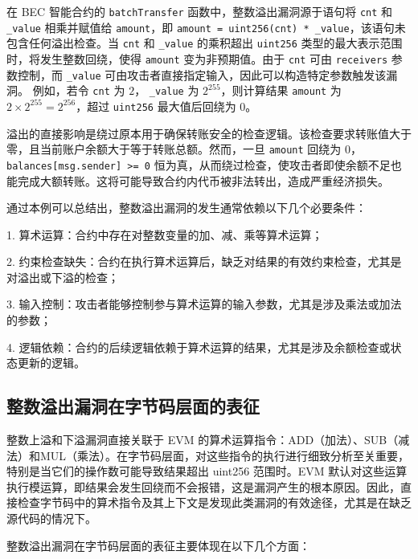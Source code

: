 \documentclass[print, master, vlined, timesmath]{DissertUESTC}
\begin{document}


在 BEC 智能合约的 \texttt{batchTransfer} 函数中，整数溢出漏洞源于语句将 \texttt{cnt} 和 \texttt{\_value} 相乘并赋值给 \texttt{amount}，即 \texttt{amount = uint256(cnt) * \_value}，该语句未包含任何溢出检查。当 \texttt{cnt} 和 \texttt{\_value} 的乘积超出 \texttt{uint256} 类型的最大表示范围时，将发生整数回绕，使得 \texttt{amount} 变为非预期值。由于 \texttt{cnt} 可由 \texttt{receivers} 参数控制，而 \texttt{\_value} 可由攻击者直接指定输入，因此可以构造特定参数触发该漏洞。 例如，若令 \texttt{cnt} 为 $2$， \texttt{\_value} 为 $2^{255}$，则计算结果 \texttt{amount} 为 $2 \times 2^{255} = 2^{256}$，超过 \texttt{uint256} 最大值后回绕为 $0$。

溢出的直接影响是绕过原本用于确保转账安全的检查逻辑。该检查要求转账值大于零，且当前账户余额大于等于转账总额。然而，一旦 \texttt{amount} 回绕为 $0$，\texttt{balances[msg.sender] >= 0} 恒为真，从而绕过检查，使攻击者即使余额不足也能完成大额转账。这将可能导致合约内代币被非法转出，造成严重经济损失。

通过本例可以总结出，整数溢出漏洞的发生通常依赖以下几个必要条件：

1. 算术运算：合约中存在对整数变量的加、减、乘等算术运算；

2. 约束检查缺失：合约在执行算术运算后，缺乏对结果的有效约束检查，尤其是对溢出或下溢的检查；

3. 输入控制：攻击者能够控制参与算术运算的输入参数，尤其是涉及乘法或加法的参数；

4. 逻辑依赖：合约的后续逻辑依赖于算术运算的结果，尤其是涉及余额检查或状态更新的逻辑。 


\subsection{整数溢出漏洞在字节码层面的表征}
整数上溢和下溢漏洞直接关联于 EVM 的算术运算指令：ADD（加法）、SUB（减法）和MUL（乘法）。在字节码层面，对这些指令的执行进行细致分析至关重要，特别是当它们的操作数可能导致结果超出 uint256 范围时。EVM 默认对这些运算执行模运算，即结果会发生回绕而不会报错，这是漏洞产生的根本原因。因此，直接检查字节码中的算术指令及其上下文是发现此类漏洞的有效途径，尤其是在缺乏源代码的情况下。

整数溢出漏洞在字节码层面的表征主要体现在以下几个方面：
\end{document}
